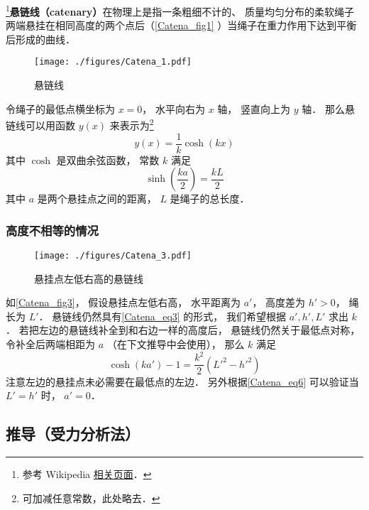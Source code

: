 

\footnote{参考 Wikipedia \href{https://en.wikipedia.org/wiki/Catenary}{相关页面}．}\textbf{悬链线（catenary）}在物理上是指一条粗细不计的、 质量均匀分布的柔软绳子两端悬挂在相同高度的两个点后（\autoref{Catena_fig1} ）当绳子在重力作用下达到平衡后形成的曲线．

\begin{figure}[ht]
\centering
\texttt{[image: ./figures/Catena\_1.pdf]}
\caption{悬链线} \label{Catena_fig1}
\end{figure}

令绳子的最低点横坐标为 $x = 0$， 水平向右为 $x$ 轴， 竖直向上为 $y$ 轴． 那么悬链线可以用函数 $y(x)$ 来表示为\footnote{可加减任意常数，此处略去．}
\begin{equation}\label{Catena_eq3}
y(x) = \frac{1}{k}\cosh(kx)
\end{equation}
其中 $\cosh$ 是双曲余弦函数， 常数 $k$ 满足
\begin{equation}\label{Catena_eq10}
\sinh(\frac{ka}{2}) = \frac{kL}{2}
\end{equation}
其中 $a$ 是两个悬挂点之间的距离， $L$ 是绳子的总长度．

\subsubsection{高度不相等的情况}
\begin{figure}[ht]
\centering
\texttt{[image: ./figures/Catena\_3.pdf]}
\caption{悬挂点左低右高的悬链线} \label{Catena_fig3}
\end{figure}
如\autoref{Catena_fig3}， 假设悬挂点左低右高， 水平距离为 $a'$， 高度差为 $h' > 0$， 绳长为 $L'$． 悬链线仍然具有\autoref{Catena_eq3} 的形式， 我们希望根据 $a', h', L'$ 求出 $k$． 若把左边的悬链线补全到和右边一样的高度后， 悬链线仍然关于最低点对称， 令补全后两端相距为 $a$ （在下文推导中会使用）， 那么 $k$ 满足
\begin{equation}\label{Catena_eq6}
\cosh(ka') - 1 = \frac{k^2}{2}(L'^2 - h'^2)
\end{equation}
注意左边的悬挂点未必需要在最低点的左边． 另外根据\autoref{Catena_eq6} 可以验证当 $L' = h'$ 时， $a' = 0$．

\subsection{推导（受力分析法）}

